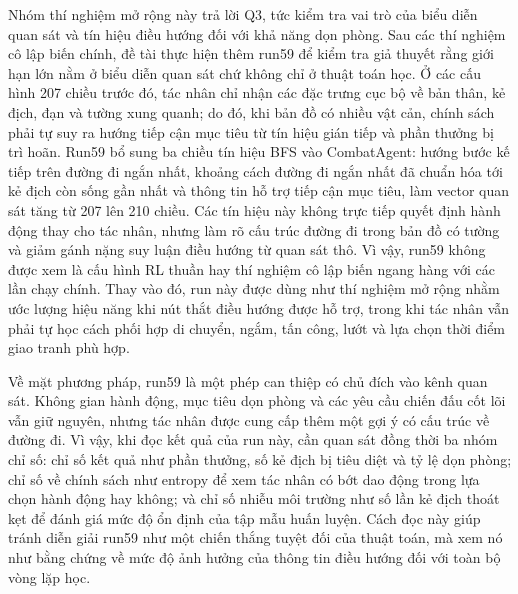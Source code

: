 Nhóm thí nghiệm mở rộng này trả lời Q3, tức kiểm tra vai trò của biểu diễn quan sát và tín hiệu điều hướng đối với khả năng dọn phòng. Sau các thí nghiệm cô lập biến chính, đề tài thực hiện thêm run59 để kiểm tra giả thuyết rằng giới hạn lớn nằm ở biểu diễn quan sát chứ không chỉ ở thuật toán học. Ở các cấu hình 207 chiều trước đó, tác nhân chỉ nhận các đặc trưng cục bộ về bản thân, kẻ địch, đạn và tường xung quanh; do đó, khi bản đồ có nhiều vật cản, chính sách phải tự suy ra hướng tiếp cận mục tiêu từ tín hiệu gián tiếp và phần thưởng bị trì hoãn. Run59 bổ sung ba chiều tín hiệu BFS vào CombatAgent: hướng bước kế tiếp trên đường đi ngắn nhất, khoảng cách đường đi ngắn nhất đã chuẩn hóa tới kẻ địch còn sống gần nhất và thông tin hỗ trợ tiếp cận mục tiêu, làm vector quan sát tăng từ 207 lên 210 chiều. Các tín hiệu này không trực tiếp quyết định hành động thay cho tác nhân, nhưng làm rõ cấu trúc đường đi trong bản đồ có tường và giảm gánh nặng suy luận điều hướng từ quan sát thô. Vì vậy, run59 không được xem là cấu hình RL thuần hay thí nghiệm cô lập biến ngang hàng với các lần chạy chính. Thay vào đó, run này được dùng như thí nghiệm mở rộng nhằm ước lượng hiệu năng khi nút thắt điều hướng được hỗ trợ, trong khi tác nhân vẫn phải tự học cách phối hợp di chuyển, ngắm, tấn công, lướt và lựa chọn thời điểm giao tranh phù hợp.

Về mặt phương pháp, run59 là một phép can thiệp có chủ đích vào kênh quan sát. Không gian hành động, mục tiêu dọn phòng và các yêu cầu chiến đấu cốt lõi vẫn giữ nguyên, nhưng tác nhân được cung cấp thêm một gợi ý có cấu trúc về đường đi. Vì vậy, khi đọc kết quả của run này, cần quan sát đồng thời ba nhóm chỉ số: chỉ số kết quả như phần thưởng, số kẻ địch bị tiêu diệt và tỷ lệ dọn phòng; chỉ số về chính sách như entropy để xem tác nhân có bớt dao động trong lựa chọn hành động hay không; và chỉ số nhiễu môi trường như số lần kẻ địch thoát kẹt để đánh giá mức độ ổn định của tập mẫu huấn luyện. Cách đọc này giúp tránh diễn giải run59 như một chiến thắng tuyệt đối của thuật toán, mà xem nó như bằng chứng về mức độ ảnh hưởng của thông tin điều hướng đối với toàn bộ vòng lặp học.

